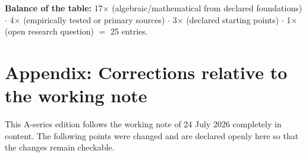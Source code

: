 \textbf{Balance of the table:} 17$\times$ \LB (algebraic/mathematical from
declared foundations) $\cdot$ 4$\times$ \LK (empirically tested or primary
sources) $\cdot$ 3$\times$ \LS (declared starting points) $\cdot$ 1$\times$ \LH
(open research question) $=$ 25 entries.

\clearpage
{}
{}
\section*{Appendix: Corrections relative to the working note}
\label{sec:corr}

This A-series edition follows the working note of 24 July 2026 completely in
content. The following points were changed and are declared openly here so that
the changes remain checkable.

